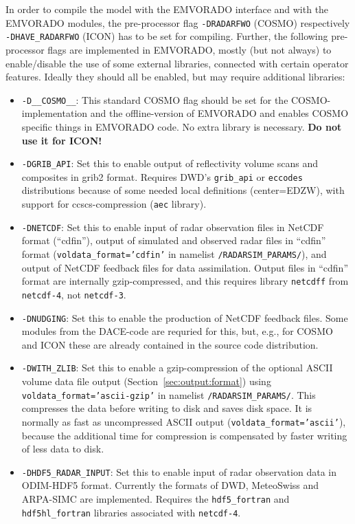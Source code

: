 \documentclass[10pt,a4paper,twoside,headinclude,footinclude,parskip=half]{scrartcl}
\newcommand{\srcform}[1]{\mbox{\texttt{#1}}\xspace}%
\begin{document}
In order to compile the model with the EMVORADO interface and with the EMVORADO modules,
the pre-processor flag \srcform{-DRADARFWO} (COSMO) respectively \srcform{-DHAVE_RADARFWO} (ICON) has to be set for compiling.
Further, the following pre-processor flags are implemented in EMVORADO, mostly (but not always) to enable/disable
the use of some external libraries, connected with certain operator features.
Ideally they should all be enabled, but may require additional libraries:
\begin{itemize}
\item \srcform{-D__COSMO__}: This standard COSMO flag should be set for the COSMO-implementation and
  the offline-version of EMVORADO and enables
  COSMO specific things in EMVORADO code. No extra library is necessary. \textbf{Do not use it for ICON!}
\item \srcform{-DGRIB_API}: Set this to enable output of reflectivity volume scans and composites in grib2
  format. Requires DWD's \srcform{grib_api} or \srcform{eccodes} distributions because of some needed local
  definitions (center=EDZW), with support for ccscs-compression (\srcform{aec} library).
\item \srcform{-DNETCDF}: Set this to enable input of radar observation files in NetCDF format (``cdfin''),
  output of simulated and observed radar files in ``cdfin'' format (\srcform{voldata_format='cdfin'} in namelist
  \srcform{/RADARSIM_PARAMS/}), and output of NetCDF feedback files
  for data assimilation. Output files in ``cdfin'' format are internally gzip-compressed, and this requires
  library \srcform{netcdff} from \srcform{netcdf-4}, not \srcform{netcdf-3}.
\item \srcform{-DNUDGING}: Set this to enable the production of NetCDF feedback files.
  Some modules from the DACE-code are requried for this, but, e.g., for COSMO and ICON these are already contained in the
  source code distribution.
\item \srcform{-DWITH_ZLIB}: Set this to enable a gzip-compression of the optional ASCII volume data file
  output (Section~\ref{sec:output:format}) using \srcform{voldata_format='ascii-gzip'} in namelist
  \srcform{/RADARSIM_PARAMS/}. This compresses the data before writing to disk and saves disk space.
  It is normally as fast as uncompressed ASCII output (\srcform{voldata_format='ascii'}), because the
  additional time for compression is compensated by faster writing of less data to disk.
\item \srcform{-DHDF5_RADAR_INPUT}: Set this to enable input of radar observation data in ODIM-HDF5 format.
  Currently the formats of DWD, MeteoSwiss and ARPA-SIMC are implemented. Requires the \srcform{hdf5_fortran}
  and \srcform{hdf5hl_fortran} libraries associated with \srcform{netcdf-4}.
\end{itemize}
\end{document}
